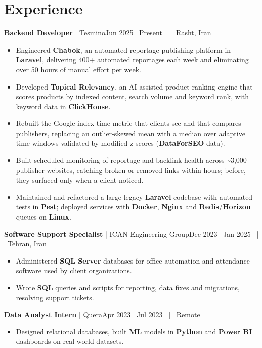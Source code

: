 \documentclass[10pt,a4paper]{article}
\newcommand{\role}[4]{%
  {\bfseries #1} \textcolor{accent}{| #2}\hfill {\small\color{muted}#3 \ | \ #4}\par}
\begin{document}
\section{Experience}
\role{Backend Developer}{Tesmino}{Jun 2025 \textendash\ Present}{Rasht, Iran}
\begin{itemize}
  \item Engineered \textbf{Chabok}, an automated reportage-publishing platform in \textbf{Laravel}, delivering 400+ automated reportages each week and eliminating over 50 hours of manual effort per week.
  \item Developed \textbf{Topical Relevancy}, an AI-assisted product-ranking engine that scores products by indexed content, search volume and keyword rank, with keyword data in \textbf{ClickHouse}.
  \item Rebuilt the Google index-time metric that clients see and that compares publishers, replacing an outlier-skewed mean with a median over adaptive time windows validated by modified z-scores (\textbf{DataForSEO} data).
  \item Built scheduled monitoring of reportage and backlink health across \textasciitilde 3,000 publisher websites, catching broken or removed links within hours; before, they surfaced only when a client noticed.
  \item Maintained and refactored a large legacy \textbf{Laravel} codebase with automated tests in \textbf{Pest}; deployed services with \textbf{Docker}, \textbf{Nginx} and \textbf{Redis}/\textbf{Horizon} queues on \textbf{Linux}.
\end{itemize}
\vspace{3pt}
\role{Software Support Specialist}{ICAN Engineering Group}{Dec 2023 \textendash\ Jan 2025}{Tehran, Iran}
\begin{itemize}
  \item Administered \textbf{SQL Server} databases for office-automation and attendance software used by client organizations.
  \item Wrote \textbf{SQL} queries and scripts for reporting, data fixes and migrations, resolving  support tickets.
\end{itemize}
\vspace{3pt}
\role{Data Analyst Intern}{Quera}{Apr 2023 \textendash\ Jul 2023}{Remote}
\begin{itemize}
  \item Designed relational databases, built \textbf{ML} models in \textbf{Python} and \textbf{Power BI} dashboards on real-world datasets.
\end{itemize}
\end{document}
